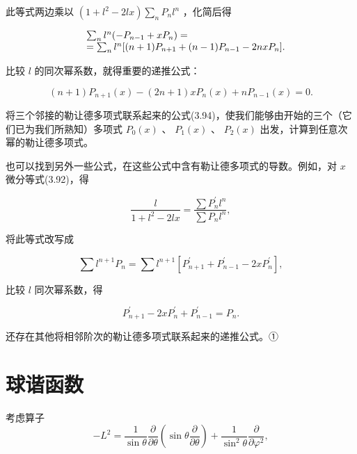 此等式两边乘以 $(1 + l^2 - 2lx)\sum_{n}P_nl^n$ ，化简后得

\begin{equation*}
\begin{array}{r l} & \sum_ {n} l ^ {n} (- P _ {n - 1} + x P _ {n}) = \\ & = \sum_ {n} l ^ {n} [ (n + 1) P _ {n + 1} + (n - 1) P _ {n - 1} - 2 n x P _ {n} ]. \end{array}
\end{equation*}

比较 $l$ 的同次幂系数，就得重要的递推公式：

\begin{equation*}
(n + 1) P _ {n + 1} (x) - (2 n + 1) x P _ {n} (x) + n P _ {n - 1} (x) = 0.\tag{3.94}
\end{equation*}

将三个邻接的勒让德多项式联系起来的公式(3.94)，使我们能够由开始的三个（它们已为我们所熟知）多项式 $P_{0}(x)$ 、 $P_{1}(x)$ 、 $P_{2}(x)$ 出发，计算到任意次幂的勒让德多项式。

也可以找到另外一些公式，在这些公式中含有勒让德多项式的导数。例如，对 $x$ 微分等式(3.92)，得

\begin{equation*}
\frac {l}{1 + l ^ {2} - 2 l x} = \frac {\sum P _ {n} ^ {\prime} l ^ {n}}{\sum P _ {n} l ^ {n}},
\end{equation*}

将此等式改写成

\begin{equation*}
\sum l ^ {n + 1} P _ {n} = \sum l ^ {n + 1} \left[ P _ {n + 1} ^ {\prime} + P _ {n - 1} ^ {\prime} - 2 x P _ {n} ^ {\prime} \right],
\end{equation*}

比较 $l$ 同次幂系数，得

\begin{equation*}
P _ {n + 1} ^ {\prime} - 2 x P _ {n} ^ {\prime} + P _ {n - 1} ^ {\prime} = P _ {n}.\tag{3.95}
\end{equation*}

还存在其他将相邻阶次的勒让德多项式联系起来的递推公式。①

\section{球谐函数}

考虑算子
\begin{equation*}
- L ^ {2} = \frac {1}{\sin \theta} \frac {\partial}{\partial \theta} \left(\sin \theta \frac {\partial}{\partial \theta}\right) + \frac {1}{\sin^ {2} \theta} \frac {\partial}{\partial \varphi^ {2}},\tag{3.96}
\end{equation*}

